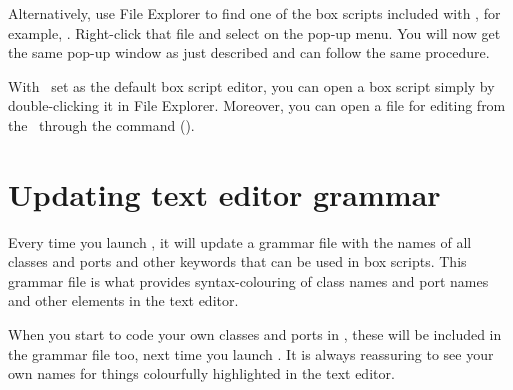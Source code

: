 Alternatively, use File Explorer to find one of the box scripts included with \US, for example, . Right-click that file and select  on the pop-up menu. You will now get the same pop-up window as just described and can follow the same procedure.

With \NPP\ set as the default box script editor, you can open a box script simply by double-clicking it in File Explorer. Moreover, you can open a file for editing from the \US\ through the  command ().


\section{Updating text editor grammar} 
Every time you launch \US, it will update a grammar file with the names of all classes and ports and other keywords that can be used in box scripts. This grammar file is what provides syntax-colouring of class names and port names and other elements in the text editor.

When you start to code your own classes and ports in \CPP, these will be included in the grammar file too, next time you launch \US. It is always reassuring to see your own names for things colourfully highlighted in the text editor.
